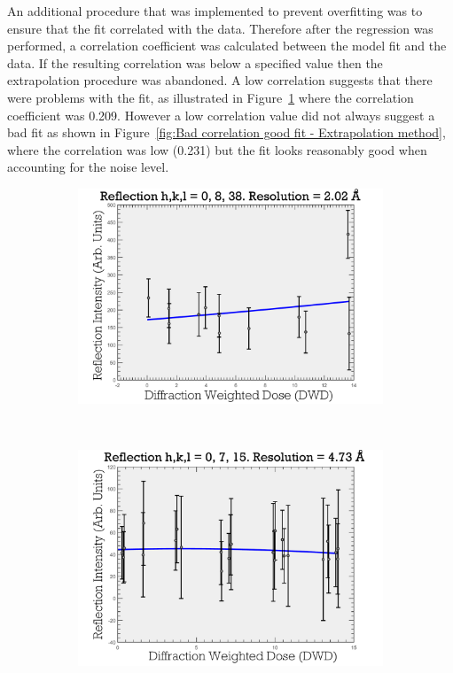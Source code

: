 An additional procedure that was implemented to prevent overfitting was to ensure that the fit correlated with the data.
Therefore after the regression was performed, a correlation coefficient was calculated between the model fit and the data.
If the resulting correlation was below a specified value then the extrapolation procedure was abandoned.
A low correlation suggests that there were problems with the fit, as illustrated in Figure~\ref{fig:Bad correlation bad fit - Extrapolation method} where the correlation coefficient was 0.209.
However a low correlation value did not always suggest a bad fit as shown in Figure~\ref{fig:Bad correlation good fit - Extrapolation method}, where the correlation was low (0.231) but the fit looks reasonably good when accounting for the noise level.
\begin{figure}
        \centering
        \begin{subfigure}[b]{0.9\textwidth}
                \centering
                \includegraphics[width=\textwidth]{figures/zde/ReflectionPlot_h,k,l_0,8,38-bad_corr_bad_fit.pdf}
                \caption{}
                \label{fig:Bad correlation bad fit - Extrapolation method}
        \end{subfigure}
				\\
        \begin{subfigure}[b]{0.9\textwidth}
                \centering
                \includegraphics[width=\textwidth]{figures/zde/ReflectionPlot_h,k,l_0,7,15-bad_corr_good_fit.pdf}

\end{subfigure}
\end{figure}
